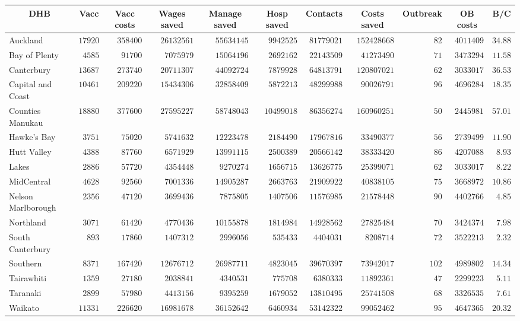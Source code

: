 \documentclass{article}
\begin{document}
\begin{table}\small
\begin{center}
\begin{tabular}{lrrrrrrrrrr}
\hline\hline
\multicolumn{1}{c}{DHB}&\multicolumn{1}{c}{Vacc}&\multicolumn{1}{c}{Vacc costs}&\multicolumn{1}{c}{Wages saved}&\multicolumn{1}{c}{Manage saved}&\multicolumn{1}{c}{Hosp saved}&\multicolumn{1}{c}{Contacts}&\multicolumn{1}{c}{Costs saved}&\multicolumn{1}{c}{Outbreak}&\multicolumn{1}{c}{OB costs}&\multicolumn{1}{c}{B/C}\tabularnewline
\hline
Auckland&$17920$&$358400$&$26132561$&$55634145$&$ 9942525$&$81779021$&$152428668$&$ 82$&$4011409$&$34.88$\tabularnewline
Bay of Plenty&$ 4585$&$ 91700$&$ 7075979$&$15064196$&$ 2692162$&$22143509$&$ 41273490$&$ 71$&$3473294$&$11.58$\tabularnewline
Canterbury&$13687$&$273740$&$20711307$&$44092724$&$ 7879928$&$64813791$&$120807021$&$ 62$&$3033017$&$36.53$\tabularnewline
Capital and Coast&$10461$&$209220$&$15434306$&$32858409$&$ 5872213$&$48299988$&$ 90026791$&$ 96$&$4696284$&$18.35$\tabularnewline
Counties Manukau&$18880$&$377600$&$27595227$&$58748043$&$10499018$&$86356274$&$160960251$&$ 50$&$2445981$&$57.01$\tabularnewline
Hawke's Bay&$ 3751$&$ 75020$&$ 5741632$&$12223478$&$ 2184490$&$17967816$&$ 33490377$&$ 56$&$2739499$&$11.90$\tabularnewline
Hutt Valley&$ 4388$&$ 87760$&$ 6571929$&$13991115$&$ 2500389$&$20566142$&$ 38333420$&$ 86$&$4207088$&$ 8.93$\tabularnewline
Lakes&$ 2886$&$ 57720$&$ 4354448$&$ 9270274$&$ 1656715$&$13626775$&$ 25399071$&$ 62$&$3033017$&$ 8.22$\tabularnewline
MidCentral&$ 4628$&$ 92560$&$ 7001336$&$14905287$&$ 2663763$&$21909922$&$ 40838105$&$ 75$&$3668972$&$10.86$\tabularnewline
Nelson Marlborough&$ 2356$&$ 47120$&$ 3699436$&$ 7875805$&$ 1407506$&$11576985$&$ 21578448$&$ 90$&$4402766$&$ 4.85$\tabularnewline
Northland&$ 3071$&$ 61420$&$ 4770436$&$10155878$&$ 1814984$&$14928562$&$ 27825484$&$ 70$&$3424374$&$ 7.98$\tabularnewline
South Canterbury&$  893$&$ 17860$&$ 1407312$&$ 2996056$&$  535433$&$ 4404031$&$  8208714$&$ 72$&$3522213$&$ 2.32$\tabularnewline
Southern&$ 8371$&$167420$&$12676712$&$26987711$&$ 4823045$&$39670397$&$ 73942017$&$102$&$4989802$&$14.34$\tabularnewline
Tairawhiti&$ 1359$&$ 27180$&$ 2038841$&$ 4340531$&$  775708$&$ 6380333$&$ 11892361$&$ 47$&$2299223$&$ 5.11$\tabularnewline
Taranaki&$ 2899$&$ 57980$&$ 4413156$&$ 9395259$&$ 1679052$&$13810495$&$ 25741508$&$ 68$&$3326535$&$ 7.61$\tabularnewline
Waikato&$11331$&$226620$&$16981678$&$36152642$&$ 6460934$&$53142322$&$ 99052462$&$ 95$&$4647365$&$20.32$\tabularnewline

\end{tabular}
\end{center}
\end{table}
\end{document}

